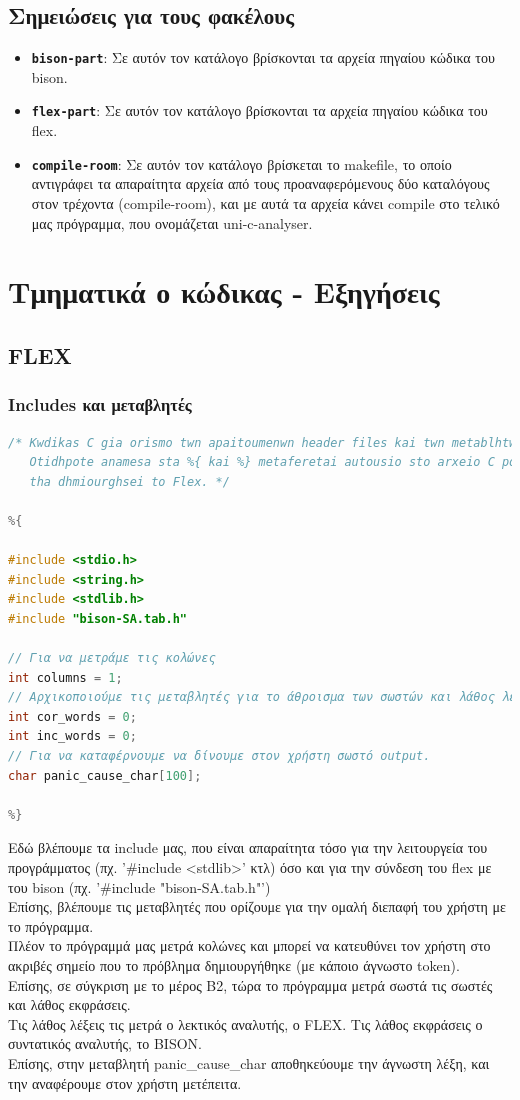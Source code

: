\documentclass[14pt]{extarticle}
\begin{document}
\subsection{Σημειώσεις για τους φακέλους}
\begin{itemize}
\item \texttt{\textbf{bison-part}}:
Σε αυτόν τον κατάλογο βρίσκονται τα αρχεία πηγαίου κώδικα του bison.
\item \texttt{\textbf{flex-part}}:
Σε αυτόν τον κατάλογο βρίσκονται τα αρχεία πηγαίου κώδικα του flex.
\item \texttt{\textbf{compile-room}}:
Σε αυτόν τον κατάλογο βρίσκεται το makefile, το οποίο αντιγράφει τα απαραίτητα
αρχεία από τους προαναφερόμενους δύο καταλόγους στον τρέχοντα (compile-room),
και με αυτά τα αρχεία κάνει compile στο τελικό μας πρόγραμμα, που ονομάζεται
uni-c-analyser.
\end{itemize}

\clearpage
\section{Τμηματικά ο κώδικας - Εξηγήσεις}

\subsection{FLEX}
\subsubsection{Includes και μεταβλητές}
\begin{lstlisting}[language=C]
/* Kwdikas C gia orismo twn apaitoumenwn header files kai twn metablhtwn.
   Otidhpote anamesa sta %{ kai %} metaferetai autousio sto arxeio C pou
   tha dhmiourghsei to Flex. */

%{

#include <stdio.h>
#include <string.h>
#include <stdlib.h>
#include "bison-SA.tab.h"

// Για να μετράμε τις κολώνες
int columns = 1;
// Αρχικοποιούμε τις μεταβλητές για το άθροισμα των σωστών και λάθος λέξεων
int cor_words = 0;
int inc_words = 0;
// Για να καταφέρνουμε να δίνουμε στον χρήστη σωστό output.
char panic_cause_char[100];

%}
\end{lstlisting}
Εδώ βλέπουμε τα include μας, που είναι απαραίτητα τόσο για την λειτουργεία του
προγράμματος (πχ. '\#include <stdlib>' κτλ) όσο και για την σύνδεση του flex με
του bison (πχ. '\#include "bison-SA.tab.h"')
\\
Επίσης, βλέπουμε τις μεταβλητές που ορίζουμε για την ομαλή διεπαφή του χρήστη
με το πρόγραμμα.
\\
Πλέον το πρόγραμμά μας μετρά κολώνες και μπορεί να κατευθύνει τον χρήστη στο
ακριβές σημείο που το πρόβλημα δημιουργήθηκε (με κάποιο άγνωστο token).
\\
Επίσης, σε σύγκριση με το μέρος B2, τώρα το πρόγραμμα μετρά σωστά τις σωστές
και λάθος εκφράσεις. 
\\
Τις λάθος λέξεις τις μετρά ο λεκτικός αναλυτής, ο FLEX.
Τις λάθος εκφράσεις ο συντατικός αναλυτής, το BISON.
\\
Επίσης, στην μεταβλητή panic\_cause\_char αποθηκεύουμε την άγνωστη λέξη, και την
αναφέρουμε στον χρήστη μετέπειτα.
\end{document}
